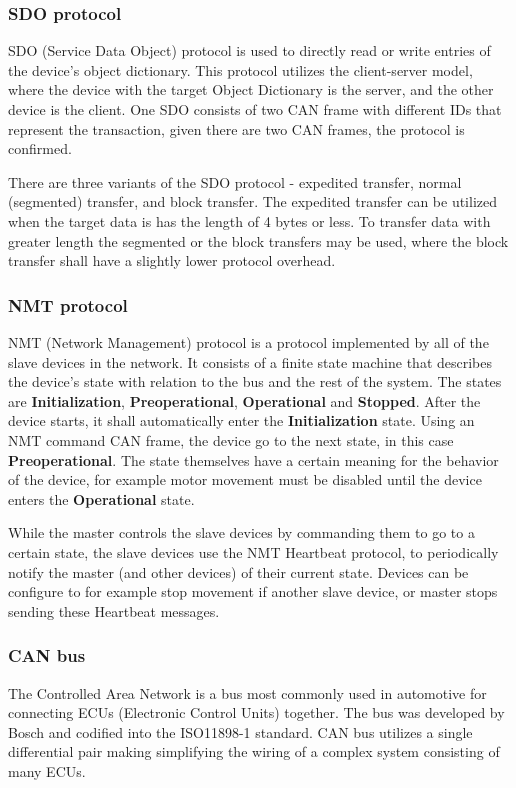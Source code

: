 \subsubsection{SDO protocol}
SDO (Service Data Object) protocol is used to directly read or write entries of the device's object dictionary.
This protocol utilizes the client-server model, where the device with the target Object Dictionary is the server, and the other device is the client.
One SDO consists of two CAN frame with different IDs that represent the transaction, given there are two CAN frames, the protocol is confirmed\cite{can_in_automation_can_2021}.

There are three variants of the SDO protocol - expedited transfer, normal (segmented) transfer, and block transfer.
The expedited transfer can be utilized when the target data is has the length of 4 bytes or less.
To transfer data with greater length the segmented or the block transfers may be used, where the block transfer shall have a slightly lower protocol overhead\cite{noauthor_canopen_2021}.

\subsubsection{NMT protocol}
NMT (Network Management) protocol is a protocol implemented by all of the slave devices in the network.
It consists of a finite state machine that describes the device's state with relation to the bus and the rest of the system.
The states are \textbf{Initialization}, \textbf{Preoperational}, \textbf{Operational} and \textbf{Stopped}.
After the device starts, it shall automatically enter the \textbf{Initialization} state.
Using an NMT command CAN frame, the device go to the next state, in this case \textbf{Preoperational}.
The state themselves have a certain meaning for the behavior of the device, for example motor movement must be disabled until the device enters the \textbf{Operational} state.

While the master controls the slave devices by commanding them to go to a certain state, the slave devices use the NMT Heartbeat protocol, to periodically notify the master (and other devices) of their current state.
Devices can be configure to for example stop movement if another slave device, or master stops sending these Heartbeat messages.

\subsubsection{CAN bus}
The Controlled Area Network is a bus most commonly used in automotive for connecting ECUs (Electronic Control Units) together.
The bus was developed by Bosch and codified into the ISO11898-1 standard.
CAN bus utilizes a single differential pair making simplifying the wiring of a complex system consisting of many ECUs\cite{st_michael_introduction_2019}.

